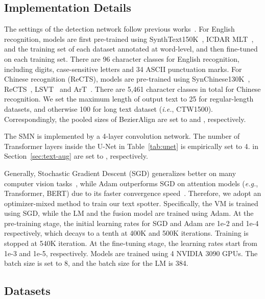 \documentclass[10pt,journal,compsoc]{IEEEtran}
\def\ie{{\it i.e.}\xspace}
\def\eg{{\it e.g.}\xspace}
\begin{document}
\subsection{Implementation Details}

The settings of the detection network follow previous works~\cite{liu2020abcnetv2,liu2020abcnet}. For English recognition, models are first pre-trained using SynthText150K~\cite{liu2020abcnet}, ICDAR MLT~\cite{nayef2017icdar2017}, and the training set of each dataset annotated at word-level, and then fine-tuned on each training set. There are 96 character classes for English recognition, including digits, case-sensitive letters and 34 ASCII punctuation marks. For Chinese recognition (ReCTS), models are pre-trained using SynChinese130K~\cite{liu2020abcnet}, ReCTS~\cite{zhang2019icdar}, LSVT~\cite{sun2019icdar} and ArT~\cite{chng2019icdar2019}. There are 5,461 character classes in total for Chinese recognition. We set the maximum length of output text to 25 for regular-length datasets, and otherwise 100 for long text dataset (\ie, CTW1500). Correspondingly, the pooled sizes of BezierAlign are set to  and , respectively.

The SMN is implemented by a 4-layer convolution network. The number of Transformer layers inside the U-Net in Table~\ref{tab:unet} is empirically set to 4.  in Section~\ref{sec:text-aug} are set to , respectively.

Generally, Stochastic Gradient Descent (SGD) generalizes better on many computer vision tasks~\cite{zhou2020towards, he2017mask}, while Adam outperforms SGD on attention models (\eg, Transformer\cite{vaswani2017attention}, BERT\cite{devlin2018bert}) due to its faster convergence speed~\cite{zhang2019adam}. Therefore, we adopt an optimizer-mixed method to train our text spotter. Specifically, the VM is trained using SGD, while the LM and the fusion model are trained using Adam. At the pre-training stage, the initial learning rates for SGD and Adam are 1e-2 and 1e-4 respectively, which decays to a tenth at 400K and 500K iterations. Training is stopped at 540K iteration. At the fine-tuning stage, the learning rates start from 1e-3 and 1e-5, respectively. Models are trained using 4 NVIDIA 3090 GPUs. The batch size is set to 8, and the batch size  for the LM is 384.


\subsection{Datasets}
\end{document}
